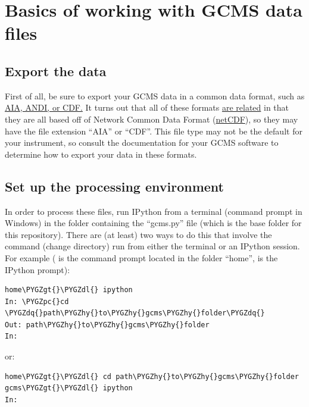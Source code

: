 \documentclass[letterpaper,10pt,english]{sphinxmanual}
\def\PYGZgt{\char`\>}
\def\PYGZpc{\char`\%}
\def\PYGZdl{\char`\$}
\def\PYGZhy{\char`\-}
\def\PYGZdq{\char`\"}
\begin{document}
\chapter{Basics of working with GCMS data files}
\label{basics:basics-of-working-with-gcms-data-files}\label{basics:version-control-software-git}\label{basics::doc}

\section{Export the data}
\label{basics:export-the-data}
First of all, be sure to export your GCMS data in a common data format, such
as \href{http://en.wikipedia.org/wiki/Mass\_spectrometry\_data\_format\#ANDI-MS\_or\_netCDF}{AIA, ANDI, or CDF.} It turns out that all of these formats \href{https://www.unidata.ucar.edu/support/help/MailArchives/netcdf/msg05748.html}{are related}
in that they are all based off of Network Common Data Format (\href{http://en.wikipedia.org/wiki/NetCDF}{netCDF}), so
they may have the file extension ``AIA'' or ``CDF''. This file type may not be the
default for your instrument, so consult the documentation for your GCMS
software to determine how to export your data in these formats.


\section{Set up the processing environment}
\label{basics:netcdf}\label{basics:set-up-the-processing-environment}
In order to process these files, run IPython from a terminal (command prompt
in Windows) in the folder containing the ``gcms.py'' file (which is the base
folder for this repository).  There are (at least) two ways to do this that
involve the command  (change directory) run from either the terminal or
an IPython session. For example ( is the command prompt located in
the folder ``home'',  is the IPython prompt):

\begin{Verbatim}[commandchars=\\\{\}]
home\PYGZgt{}\PYGZdl{} ipython
In: \PYGZpc{}cd \PYGZdq{}path\PYGZhy{}to\PYGZhy{}gcms\PYGZhy{}folder\PYGZdq{}
Out: path\PYGZhy{}to\PYGZhy{}gcms\PYGZhy{}folder
In:
\end{Verbatim}

or:

\begin{Verbatim}[commandchars=\\\{\}]
home\PYGZgt{}\PYGZdl{} cd path\PYGZhy{}to\PYGZhy{}gcms\PYGZhy{}folder
gcms\PYGZgt{}\PYGZdl{} ipython
In:
\end{Verbatim}
\end{document}
